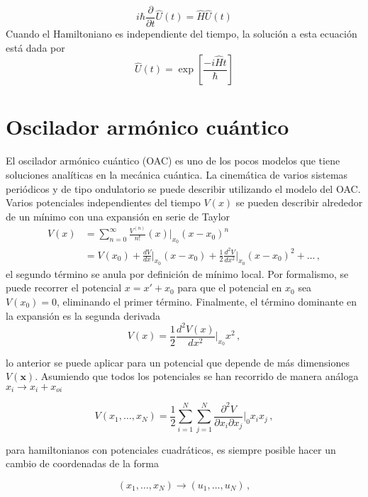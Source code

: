 \begin{equation}
  i\hbar\frac{\partial}{\partial t} \hat{U}(t) = \hat{H}\hat{U}(t)
\end{equation}
Cuando el Hamiltoniano es independiente del tiempo, la solución a esta ecuación está dada por
\begin{equation*}
  \hat{U}(t) = \exp{\left[ \frac{-i\hat{H}t}{\hbar} \right]}
\end{equation*}
\section{Oscilador armónico cuántico}

El oscilador armónico cuántico (OAC) es uno de los pocos modelos que tiene soluciones analíticas en la mecánica cuántica. La cinemática de varios sistemas periódicos y de tipo ondulatorio se puede describir utilizando el modelo del OAC.
Varios potenciales independientes del tiempo $V(x)$ se pueden describir alrededor de un mínimo con una expansión en serie de Taylor
\begin{align*}
  V(x) & = \sum_{n=0}^{\infty} \frac{V^{(n)}}{n!} (x)|_{x_0} (x-x_0)^n \\ &= V(x_0) + \frac{dV}{dx}\Big|_{x_0} (x-x_0) + \frac{1}{2}\frac{d^2V}{dx^2}\Big|_{x_0} (x-x_0)^2 + \dots \,,
\end{align*}
el segundo término se anula por definición de mínimo local. Por formalismo, se puede recorrer el potencial $x = x' + x_0$ para que el potencial en $x_0$ sea $V(x_0) = 0$, eliminando el primer término. Finalmente, el término dominante en la expansión es la segunda derivada
\begin{equation}
  \label{OA.1}
  V(x) = \frac{1}{2}\frac{d^2V(x)}{dx^2}\Big|_{x_0}x^2 \,,
\end{equation}

lo anterior se puede aplicar para un potencial que depende de más dimensiones $V(\mathbf{x})$. Asumiendo que todos los potenciales se han recorrido de manera análoga $x_i \to x_i + x_{oi}$

\begin{equation*}
  V(x_1, \dots, x_N) = \frac{1}{2}\sum_{i=1}^N \sum_{j=1}^N \frac{\partial^2 V}{\partial x_i \partial x_j}\Big|_{0} x_i x_j \,,
\end{equation*}

para hamiltonianos con potenciales cuadráticos, es siempre posible hacer un cambio de coordenadas de la forma

\begin{equation*}
  (x_{1}, \dots, x_N) \to (u_1, \dots, u_N)\,,
\end{equation*}

